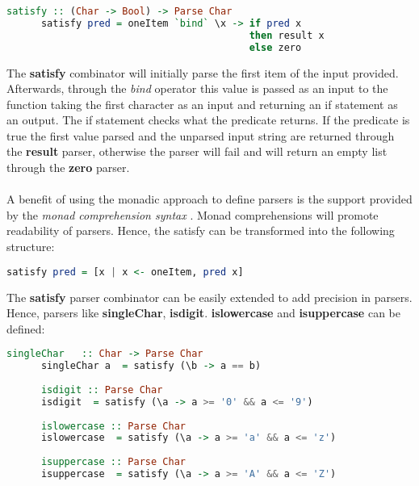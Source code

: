 \documentclass[a4paper, onecolumn]{article}
\begin{document}
    \begin{tcolorbox}
    \begin{lstlisting}[language=Haskell]
      satisfy :: (Char -> Bool) -> Parse Char
      satisfy pred = oneItem `bind` \x -> if pred x 
                                          then result x 
                                          else zero
    \end{lstlisting}
    \end{tcolorbox}
    
    The \textbf{satisfy} combinator will initially parse the first item of the input provided. Afterwards, through the \textit{bind} operator this value is passed as an input to the function taking the first character as an input and returning an if statement as an output. The if statement checks what the predicate returns. If the predicate is true the first value parsed and the unparsed input string are returned through the \textbf{result} parser, otherwise the parser will fail and will return an empty list through the \textbf{zero} parser.  \\ \\
    A benefit of using the monadic approach to define parsers is the support provided by the \textit{monad comprehension syntax} \cite{bringMonadComprehension}. Monad comprehensions will promote readability of parsers. Hence, the satisfy can be transformed into the following structure: 
    
    \begin{tcolorbox}
    \begin{lstlisting}[language=Haskell]
      satisfy pred = [x | x <- oneItem, pred x]
    \end{lstlisting}
    \end{tcolorbox}
    
    The \textbf{satisfy} parser combinator can be easily extended to add precision in parsers. Hence, parsers like \textbf{singleChar}, \textbf{isdigit}. \textbf{islowercase} and \textbf{isuppercase} can be defined:
    
    \begin{tcolorbox}
    \begin{lstlisting}[language=Haskell]
      singleChar   :: Char -> Parse Char
      singleChar a  = satisfy (\b -> a == b)
      
      isdigit :: Parse Char
      isdigit  = satisfy (\a -> a >= '0' && a <= '9')
      
      islowercase :: Parse Char
      islowercase  = satisfy (\a -> a >= 'a' && a <= 'z')
      
      isuppercase :: Parse Char 
      isuppercase  = satisfy (\a -> a >= 'A' && a <= 'Z')
    \end{lstlisting}
    \end{tcolorbox}
    
\end{document}
